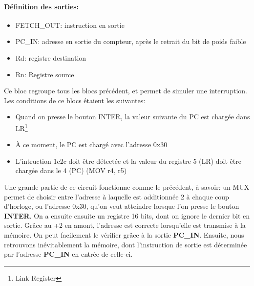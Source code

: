 \documentclass[a4paper]{article} %
\begin{document}
\paragraph{Définition des sorties:}
\begin{itemize}
    \item FETCH\_OUT: instruction en sortie
    \item PC\_IN: adresse en sortie du compteur, après le retrait du bit de poids faible
    \item Rd: registre destination
    \item Rn: Registre source
\end{itemize}
\medskip
Ce bloc regroupe tous les blocs précédent, et permet de simuler une interruption. Les conditions de ce blocs étaient les suivantes:
\begin{itemize}
   \item Quand on presse le bouton INTER, la valeur suivante du PC est chargée dans LR\footnote{Link Register}
   \item À ce moment, le PC est chargé avec l'adresse 0x30
   \item L'intruction 1c2c doit être détectée et la valeur du registre 5 (LR) doit être chargée dans le 4 (PC) (MOV r4, r5)
\end{itemize}
\medskip
Une grande partie de ce circuit fonctionne comme le précédent, à savoir: un MUX permet de choisir entre l'adresse à laquelle est additionnée 2 à chaque coup d'horloge, ou l'adresse 0x30, qu'on veut atteindre lorsque l'on presse le bouton \textbf{INTER}. On a ensuite ensuite un registre 16 bits, dont on ignore le dernier bit en sortie. Grâce au +2 en amont, l'adresse est correcte lorsqu'elle est transmise à la mémoire. On peut facilement le vérifier grâce à la sortie \textbf{PC\_IN}. Ensuite, nous retrouvons inévitablement la mémoire, dont l'instruction de sortie est déterminée par l'adresse \textbf{PC\_IN} en entrée de celle-ci.\medskip
\end{document}
